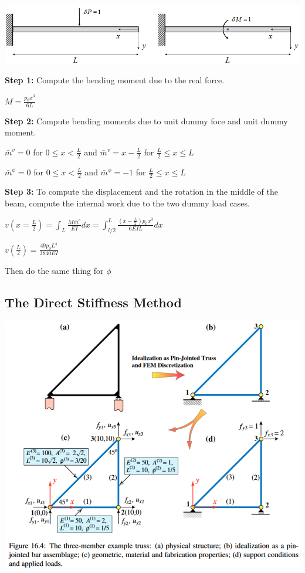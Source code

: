 \documentclass{article}
\begin{document}
\begin{multicols*}{2}
    \includegraphics[width=\linewidth]{Figures/Beam_Eample_VF_2.png}\par 
    \textbf{Step 1:} Compute the bending moment due to the real force.\par 
    $M = \frac{p_0 x^3}{6L}$\par 
    \textbf{Step 2:} Compute bending moments due to unit dummy foce and unit
    dummy moment.\par 
    $\bar{m}^v=0$ for $0 \le x < \frac{L}{2}$ and $\bar{m}^v = x - \frac{L}{2}$
    for $\frac{L}{2} \le x \le L$\par 
    $\bar{m}^\phi = 0$ for $0 \le x < \frac{L}{2}$ and $\bar{m}^\phi = -1$
    for $\frac{L}{2} \le x \le L$\par
    \textbf{Step 3:} To compute the displacement and the rotation in the middle
    of the beam, compute the internal work due to the two dummy load cases.\par 
    $v\left(x=\frac{L}{2}\right) = \int_L \frac{M\bar{m}^v}{EI}dx=\int_{l/2}^L \frac{(x-\frac{L}{2})p_0x^3}{6EIL}dx$\par 
    $v\left(\frac{L}{2}\right) = \frac{49p_0L^4}{3840EI}$\par 
    Then do the same thing for $\phi$

    \subsection*{The Direct Stiffness Method}\par 
    \includegraphics[width=\linewidth]{Figures/DSM1_Example.png}


\end{multicols*}
\end{document}

